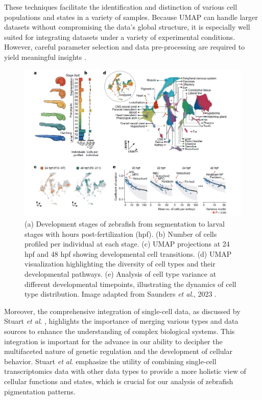 \documentclass[runningheads]{llncs}
\begin{document}
These techniques facilitate the identification and distinction of various cell populations and states in a variety of samples. Because UMAP can handle larger datasets without compromising the data's global structure, it is especially well suited for integrating datasets under a variety of experimental conditions. However, careful parameter selection and data pre-processing are required to yield meaningful insights \cite{nayak2021hitchhiker}.
\begin{figure}[htbp]
    \centering
    \includegraphics[width=\textwidth]{Fig1.jpg}
    \caption{(a) Development stages of zebrafish from segmentation to larval stages with hours post-fertilization (hpf). (b) Number of cells profiled per individual at each stage. (c) UMAP projections at 24 hpf and 48 hpf showing developmental cell transitions. (d) UMAP visualization highlighting the diversity of cell types and their developmental pathways. (e) Analysis of cell type variance at different developmental timepoints, illustrating the dynamics of cell type distribution. Image adapted from Saunders \textit{et al}., 2023 \cite{saunders2023embryo}.}
    \label{fig:development_stages_cells}
\end{figure}
Moreover, the comprehensive integration of single-cell data, as discussed by Stuart \textit{et al}. \cite{stuart2019comprehensive}, highlights the importance of merging various types and data sources to enhance the understanding of complex biological systems. This integration is important for the advance in our ability to decipher the multifaceted nature of genetic regulation and the development of cellular behavior. Stuart \textit{et al}. emphasize the utility of combining single-cell transcriptomics data with other data types to provide a more holistic view of cellular functions and states, which is crucial for our analysis of zebrafish pigmentation patterns.
\end{document}
